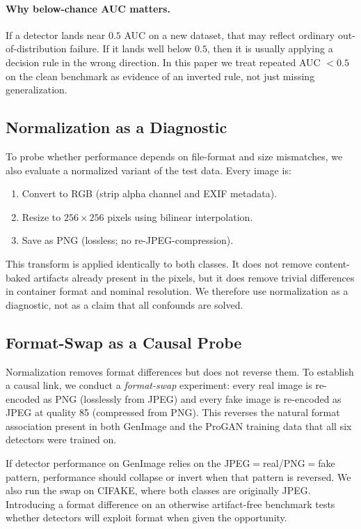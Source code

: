 \paragraph{Why below-chance AUC matters.}
If a detector lands near $0.5$ AUC on a new dataset, that may reflect ordinary out-of-distribution failure. If it lands well below $0.5$, then it is usually applying a decision rule in the wrong direction. In this paper we treat repeated AUC $< 0.5$ on the clean benchmark as evidence of an inverted rule, not just missing generalization.

\subsection{Normalization as a Diagnostic}
\label{sec:normalize}

To probe whether performance depends on file-format and size mismatches, we also evaluate a normalized variant of the test data. Every image is:
\begin{enumerate}
  \item Convert to RGB (strip alpha channel and EXIF metadata).
  \item Resize to $256 \times 256$ pixels using bilinear interpolation.
  \item Save as PNG (lossless; no re-JPEG-compression).
\end{enumerate}
This transform is applied identically to both classes. It does not remove content-baked artifacts already present in the pixels, but it does remove trivial differences in container format and nominal resolution. We therefore use normalization as a diagnostic, not as a claim that all confounds are solved.

\subsection{Format-Swap as a Causal Probe}
\label{sec:swap_method}

Normalization removes format differences but does not reverse them. To establish a causal link, we conduct a \emph{format-swap} experiment: every real image is re-encoded as PNG (losslessly from JPEG) and every fake image is re-encoded as JPEG at quality 85 (compressed from PNG). This reverses the natural format association present in both GenImage and the ProGAN training data that all six detectors were trained on.

If detector performance on GenImage relies on the JPEG$=$real/PNG$=$fake pattern, performance should collapse or invert when that pattern is reversed. We also run the swap on CIFAKE, where both classes are originally JPEG. Introducing a format difference on an otherwise artifact-free benchmark tests whether detectors will exploit format when given the opportunity.

